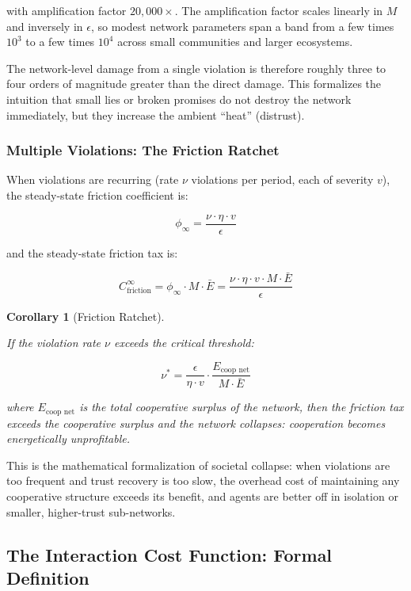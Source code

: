 \documentclass[11pt]{article}
\theoremstyle{plain}
\newtheorem{corollary}[theorem]{Corollary}
\theoremstyle{definition}
\theoremstyle{remark}
\let\origsubsection\subsection
\renewcommand{\subsection}{\needspace{7\baselineskip}\origsubsection}
\let\origsubsubsection\subsubsection
\renewcommand{\subsubsection}{\needspace{4\baselineskip}\origsubsubsection}
\begin{document}
with amplification factor \(20{,}000\times\). The amplification factor
scales linearly in \(M\) and inversely in \(\epsilon\), so modest
network parameters span a band from a few times \(10^3\) to a few times
\(10^4\) across small communities and larger ecosystems.

The network-level damage from a single violation is therefore roughly
three to four orders of magnitude greater than the direct damage. This
formalizes the intuition that small lies or broken promises do not
destroy the network immediately, but they increase the ambient ``heat''
(distrust).

\subsubsection{Multiple Violations: The Friction
Ratchet}\label{multiple-violations-the-friction-ratchet}

When violations are recurring (rate \(\nu\) violations per period, each
of severity \(v\)), the steady-state friction coefficient is:

\[\phi_{\infty} = \frac{\nu \cdot \eta \cdot v}{\epsilon}\]

and the steady-state friction tax is:

\[C_{\text{friction}}^{\infty} = \phi_{\infty} \cdot M \cdot \bar{E} = \frac{\nu \cdot \eta \cdot v \cdot M \cdot \bar{E}}{\epsilon}\]

\begin{corollary}[Friction Ratchet]
\label{cor-friction-ratchet}

If the violation rate $\nu$ exceeds the critical threshold:

$$\nu^* = \frac{\epsilon}{\eta \cdot v} \cdot \frac{E_{\text{coop net}}}{M \cdot \bar{E}}$$

where $E_{\text{coop net}}$ is the total cooperative surplus of the network, then the friction tax exceeds the cooperative surplus and the network collapses: cooperation becomes energetically unprofitable.
\end{corollary}

This is the mathematical formalization of societal collapse: when
violations are too frequent and trust recovery is too slow, the overhead
cost of maintaining any cooperative structure exceeds its benefit, and
agents are better off in isolation or smaller, higher-trust
sub-networks.

\subsection{The Interaction Cost Function: Formal
Definition}\label{the-interaction-cost-function-formal-definition}
\end{document}

